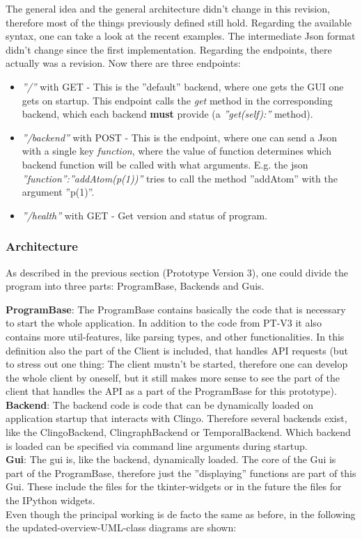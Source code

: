 \documentclass[12pt,a4paper]{article}
\newcommand{\<}[1]{\guilsinglleft}
\renewcommand{\>}[1]{\guilsinglright}
\begin{document}
\noindent
The general idea and the general architecture didn't change in this revision, therefore most of the things previously defined still hold. Regarding the available syntax, one can take a look at the recent examples. The intermediate Json format didn't change since the first implementation. Regarding the endpoints, there actually was a revision. Now there are three endpoints:
\begin{itemize}
    \item \textit{''/''} with GET - This is the ''default'' backend, where one gets the GUI one gets on startup. This endpoint calls the \textit{get} method in the corresponding backend, which each backend \textbf{must} provide (a \textit{''get(self):''} method).
    \item \textit{''/backend''} with POST - This is the endpoint, where one can send a Json with a single key \textit{function}, where the value of function determines which backend function will be called with what arguments. E.g. the json \textit{''function'':''addAtom(p(1))''} tries to call the method ''addAtom'' with the argument ''p(1)''.
    \item \textit{''/health''} with GET - Get version and status of program.
\end{itemize}

\subsubsection{Architecture}

\noindent As described in the previous section (Prototype Version 3), one could divide the program into three parts: ProgramBase, Backends and Guis.

\textbf{ProgramBase}: The ProgramBase contains basically the code that is necessary to start the whole application. In addition to the code from PT-V3 it also contains more util-features, like parsing types, and other functionalities. In this definition also the part of the Client is included, that handles API requests (but to stress out one thing: The client mustn't be started, therefore one can develop the whole client by oneself, but it still makes more sense to see the part of the client that handles the API as a part of the ProgramBase for this prototype).\\[1em]
\textbf{Backend}: The backend code is code that can be dynamically loaded on application startup that interacts with Clingo. Therefore several backends exist, like the ClingoBackend, ClingraphBackend or TemporalBackend. Which backend is loaded can be specified via command line arguments during startup.\\[1em]
\textbf{Gui}: The gui is, like the backend, dynamically loaded. The core of the Gui is part of the ProgramBase, therefore just the ''displaying'' functions are part of this Gui. These include the files for the tkinter-widgets or in the future the files for the IPython widgets.\\[1em]
Even though the principal working is de facto the same as before, in the following the updated-overview-UML-class diagrams are shown:
\end{document}
